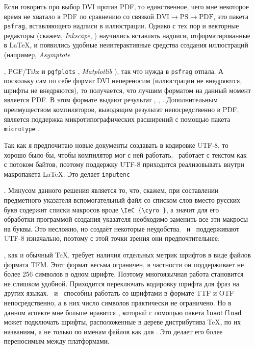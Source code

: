 \documentclass[a4paper,12pt,hyphens]{article}
\newcommand\softname[1]{\textit{#1}}
\newcommand\package[1]{\texttt{#1}}
\begin{document}
Если говорить про выбор DVI против PDF, то единственное, чего мне некоторое время
не хватало в PDF по сравнению со связкой $\text{DVI}\to\text{PS}\to\text{PDF}$,
это пакета \package{psfrag}, вставляющего надписи в иллюстрации. Однако с тех
пор и векторные редакторы (скажем, \softname{Inkscape}, \cite{site-inkscape})
научились вставлять надписи,
отформатированные в \LaTeX, и появились удобные неинтерактивные средства создания
иллюстраций (например, \softname{Asymptote}
\begin{otherlanguage}{english}\parencite{site-asymptote,ctan-asymptote}\end{otherlanguage},
PGF/Ti\emph{k}z \parencite{ctan-pgf} и \package{pgfplots} \parencite{ctan-pgfplots},
\softname{Matplotlib} \parencite{site-matplotlib}), так что нужда в \package{psfrag}
отпала. А поскольку сам по себе формат DVI непереносим (иллюстрации не
внедряются, шрифты не внедряются), то получается, что лучшим форматом на данный
момент является PDF. В этом формате выдают результат \pdfTeX, \XeTeX, \LuaTeX.
Дополнительным преимуществом компиляторов, выводящим результат непосредственно в PDF,
является поддержка микротипографических расширений с помощью пакета
\package{microtype} \parencite{ctan-microtype}.


Так как я предпочитаю новые документы создавать в кодировке UTF-8, то хорошо было
бы, чтобы компилятор мог с ней работать. \pdfTeX\ работает с текстом как с потоком
байтов, поэтому поддержку UTF-8 приходится реализовывать внутри макропакета \LaTeX.
Это делает \package{inputenc}
\begin{otherlanguage}{english}\parencite{ctan-inputenc,se-inputenc}\end{otherlanguage}.
Минусом данного решения является то, что, скажем,
при составлении предметного указателя вспомогательный файл со списком слов
вместо русских букв содержит списки макросов вроде \verb|\IeC {\cyro }|,
а значит для его обработки программой создания указателя необходимо заменить
все эти макросы на буквы. Это несложно, но создаёт некоторые неудобства.
\XeTeX\ и \LuaTeX\ поддерживают UTF-8 изначально, поэтому с этой точки зрения
они предпочтительнее.

\pdfTeX, как и обычный \TeX, требует наличия отдельных метрик шрифтов в виде
файлов формата TFM. Этот формат весьма ограничен, в частности он поддерживает не
более 256 символов в одном шрифте. Поэтому многоязычная работа становится не
слишком удобной. Приходится переключать кодировку шрифта для фраз на других
языках. \XeTeX\ и \LuaTeX\ способны работать со шрифтами в формате TTF и OTF
непосредственно, а в них число символов практически не ограничено. Но в
данном аспекте мне больше нравится \LuaTeX, который с помощью пакета
\package{luaotfload} может подключать шрифты, расположенные в дереве
дистрибутива \TeX, по их названиям, а не только по
именам файлов как для \XeTeX. Это делает его более переносимым между
платформами.
\end{document}
